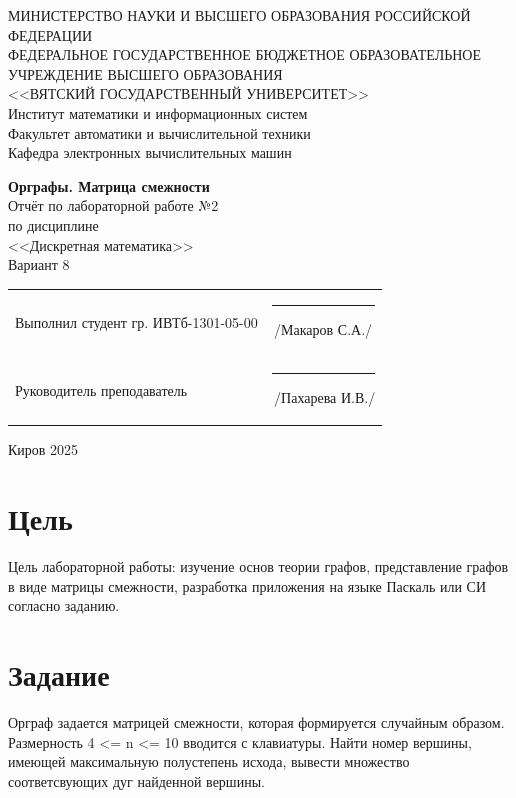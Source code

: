 \documentclass[a4paper,14pt]{extarticle}
\begin{document}
  \newpage\thispagestyle{empty}
  \begin{center}
    \MakeUppercase{
      Министерство науки и высшего образования Российской Федерации\\
      Федеральное государственное бюджетное образовательное учреждение высшего образования\\
      <<Вятский Государственный Университет>>\\
    }
    Институт математики и информационных систем\\
    Факультет автоматики и вычислительной техники\\
    Кафедра электронных вычислительных машин
  \end{center}
  \vfill

  \begin{center}
    \textbf{Орграфы. Матрица смежности}\\
    Отчёт по лабораторной работе №2\\
    по дисциплине\\
    <<Дискретная математика>>\\
    Вариант 8
  \end{center}
  \vfill

  \noindent
  \begin{tabular}{ll}
    Выполнил студент гр. ИВТб-1301-05-00 \hspace{5mm} &
    \rule[-1mm]{25mm}{0.10mm}\,/Макаров С.А./\\
    
    Руководитель преподаватель & \rule[-1mm]{25mm}{0.10mm}\,/Пахарева И.В./\\
  \end{tabular}

  \vfill
  \begin{center}
    Киров 2025
  \end{center}

  \newpage
  \section*{\hspace{12.5mm}Цель}
  Цель лабораторной работы: изучение основ теории графов, представление графов в виде матрицы смежности, разработка приложения на языке Паскаль или СИ согласно заданию.

  \section*{\hspace{12.5mm}Задание}
  Орграф задается матрицей смежности, которая формируется случайным образом. Размерность 4 <= n <= 10 вводится с клавиатуры. Найти номер вершины, имеющей максимальную полустепень исхода, вывести множество соответсвующих дуг найденной вершины.
\end{document}
